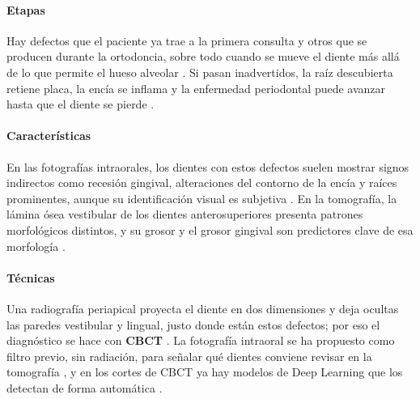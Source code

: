\documentclass[12pt,a4paper]{article}
\newcommand{\dat}[1]{\textcolor{dataset}{\textbf{#1}}}
\newcommand{\dat}[1]{#1}
\begin{document}
\paragraph{Etapas}
Hay defectos que el paciente ya trae a la primera consulta y otros que se
producen durante la ortodoncia, sobre todo cuando se mueve el diente más
allá de lo que permite el hueso alveolar \parencite{guo2026consenso}. Si
pasan inadvertidos, la raíz descubierta retiene placa, la encía se
inflama y la enfermedad periodontal puede avanzar hasta que el diente se
pierde \parencite{liu2025fdtooth}.

\paragraph{Características}
En las fotografías intraorales, los dientes con estos defectos suelen
mostrar signos indirectos como recesión gingival, alteraciones del
contorno de la encía y raíces prominentes, aunque su identificación
visual es subjetiva \parencite{liu2025fdtooth}. En la tomografía, la
lámina ósea vestibular de los dientes anterosuperiores presenta patrones
morfológicos distintos, y su grosor y el grosor gingival son predictores
clave de esa morfología \parencite{domic2026buccal}.

\paragraph{Técnicas}
Una radiografía periapical proyecta el diente en dos dimensiones y deja
ocultas las paredes vestibular y lingual, justo donde están estos
defectos; por eso el diagnóstico se hace con \dat{CBCT}
\parencite{liu2025fdtooth}. La fotografía intraoral se ha propuesto como
filtro previo, sin radiación, para señalar qué dientes conviene revisar
en la tomografía \parencite{liu2025fdtooth}, y en los cortes de CBCT ya hay
modelos de Deep Learning que los detectan de forma automática
\parencite{xu2026swinunetr}.
\end{document}
